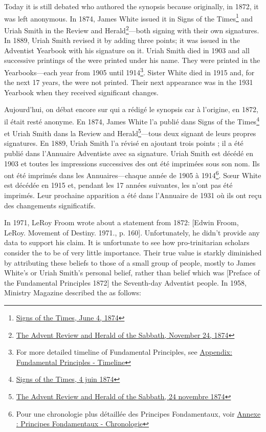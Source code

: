 Today it is still debated who authored the synopsis because originally, in 1872, it was left anonymous. In 1874, James White issued it in Signs of the Times\footnote{\href{https://adventistdigitallibrary.org/adl-364148/signs-times-june-4-1874}{Signs of the Times, June 4, 1874}} and Uriah Smith in the Review and Herald\footnote{\href{http://documents.adventistarchives.org/Periodicals/RH/RH18741124-V44-22.pdf}{The Advent Review and Herald of the Sabbath, November 24, 1874}}—both signing with their own signatures. In 1889, Uriah Smith revised it by adding three points; it was issued in the Adventist Yearbook with his signature on it. Uriah Smith died in 1903 and all successive printings of the  were printed under his name. They were printed in the Yearbooks—each year from 1905 until 1914\footnote{For more detailed timeline of Fundamental Principles, see \hyperref[appendix:timeline]{Appendix: Fundamental Principles - Timeline}}. Sister White died in 1915 and, for the next 17 years, the  were not printed. Their next appearance was in the 1931 Yearbook when they received significant changes.


Aujourd'hui, on débat encore sur qui a rédigé le synopsis car à l'origine, en 1872, il était resté anonyme. En 1874, James White l'a publié dans Signs of the Times\footnote{\href{https://adventistdigitallibrary.org/adl-364148/signs-times-june-4-1874}{Signs of the Times, 4 juin 1874}} et Uriah Smith dans la Review and Herald\footnote{\href{http://documents.adventistarchives.org/Periodicals/RH/RH18741124-V44-22.pdf}{The Advent Review and Herald of the Sabbath, 24 novembre 1874}}—tous deux signant de leurs propres signatures. En 1889, Uriah Smith l'a révisé en ajoutant trois points ; il a été publié dans l'Annuaire Adventiste avec sa signature. Uriah Smith est décédé en 1903 et toutes les impressions successives des  ont été imprimées sous son nom. Ils ont été imprimés dans les Annuaires—chaque année de 1905 à 1914\footnote{Pour une chronologie plus détaillée des Principes Fondamentaux, voir \hyperref[appendix:timeline]{Annexe : Principes Fondamentaux - Chronologie}}. Sœur White est décédée en 1915 et, pendant les 17 années suivantes, les  n'ont pas été imprimés. Leur prochaine apparition a été dans l'Annuaire de 1931 où ils ont reçu des changements significatifs.


In 1971, LeRoy Froom wrote about a statement from 1872: [Edwin Froom, LeRoy. Movement of Destiny. 1971., p. 160]. Unfortunately, he didn’t provide any data to support his claim. It is unfortunate to see how pro-trinitarian scholars consider the  to be of very little importance. Their true value is starkly diminished by attributing these beliefs to those of a small group of people, mostly to James White’s or Uriah Smith’s personal belief, rather than belief which was [Preface of the Fundamental Principles 1872] the Seventh-day Adventist people. In 1958, Ministry Magazine described the  as follows:


